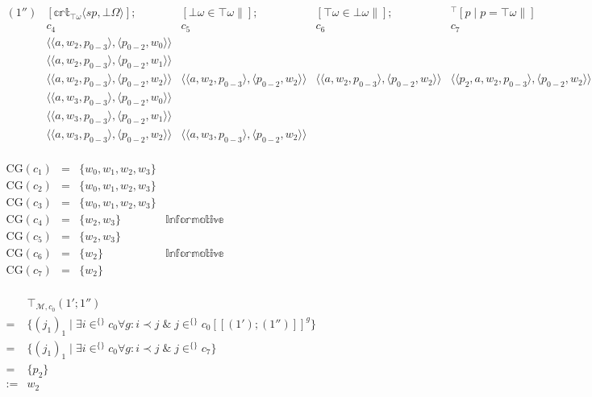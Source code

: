 \documentclass{article}
\renewcommand{\llbracket}{[\![}
\renewcommand{\rrbracket}{]\!]}
\newcommand{\tw}{\top\omega}
\newcommand{\bw}{\bot\omega}
\newcommand{\bp}{\bot\Omega}
\begin{document}
\vspace{5mm}
$\begin{array}{lllll}
(1'') & [\mathbb{crt}_{\tw}\langle sp,\bp\rangle]; & [\bw\in\tw\parallel]; & [\tw\in\bw\parallel]; & ^{\top}[p\;|\;p=\tw\parallel] \\
& c_4 & c_5 & c_6 & c_7 \\
& \langle\langle a,w_2,p_{0-3}\rangle,\langle p_{0-2},w_0\rangle\rangle & & & \\
& \langle\langle a,w_2,p_{0-3}\rangle,\langle p_{0-2},w_1\rangle\rangle & & & \\
& \langle\langle a,w_2,p_{0-3}\rangle,\langle p_{0-2},w_2\rangle\rangle & \langle\langle a,w_2,p_{0-3}\rangle,\langle p_{0-2},w_2\rangle\rangle & \langle\langle a,w_2,p_{0-3}\rangle,\langle p_{0-2},w_2\rangle\rangle & \langle\langle p_2,a,w_2,p_{0-3}\rangle,\langle p_{0-2},w_2\rangle\rangle \\
& \langle\langle a,w_3,p_{0-3}\rangle,\langle p_{0-2},w_0\rangle\rangle & & & \\
& \langle\langle a,w_3,p_{0-3}\rangle,\langle p_{0-2},w_1\rangle\rangle & & & \\
& \langle\langle a,w_3,p_{0-3}\rangle,\langle p_{0-2},w_2\rangle\rangle & \langle\langle a,w_3,p_{0-3}\rangle,\langle p_{0-2},w_2\rangle\rangle & & \\
\end{array}$

\vspace{5mm}
$\begin{array}{llll}
\textrm{CG}(c_1) & = & \{w_0,w_1,w_2,w_3\} &  \\
\textrm{CG}(c_2) & = & \{w_0,w_1,w_2,w_3\} &  \\
\textrm{CG}(c_3) & = & \{w_0,w_1,w_2,w_3\} &  \\
\textrm{CG}(c_4) & = & \{w_2,w_3\} & \mathbb{Informative} \\
\textrm{CG}(c_5) & = & \{w_2,w_3\} & \\
\textrm{CG}(c_6) & = & \{w_2\} & \mathbb{Informative} \\
\textrm{CG}(c_7) & = & \{w_2\} & \\
\end{array}$

\vspace{5mm}
$\begin{array}{ll}
& \top_{\mathcal{M},c_0}(1';1'') \\
= & \{(j_1)_1\;|\;\exists i\in ^{\{\}}c_0\forall g: i\prec j\;\&\;j\in ^{\{\}}c_0\llbracket (1');(1'')\rrbracket^g\} \\
= & \{(j_1)_1\;|\;\exists i\in ^{\{\}}c_0\forall g: i\prec j\;\&\;j\in ^{\{\}}c_7\} \\
= & \{p_2\} \\
:= & w_2 \\
\end{array}$
\end{document}
